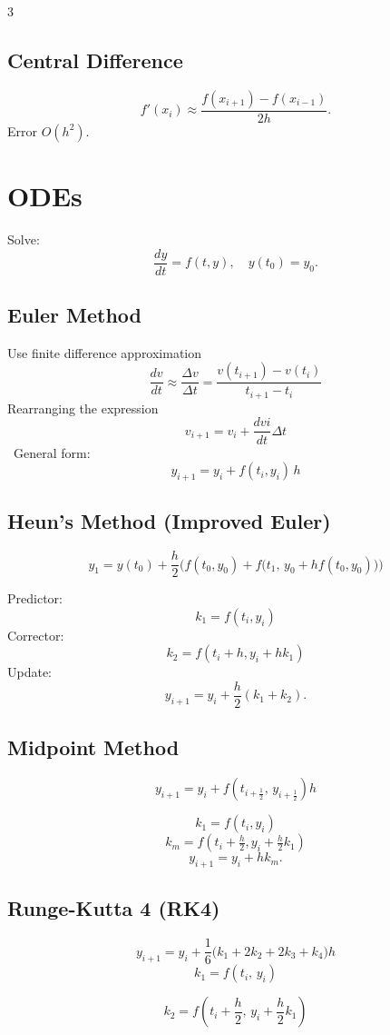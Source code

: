 \documentclass[9pt,a4paper]{article}
\begin{document}
\begin{multicols}{3}
\subsection{Central Difference}
\[
f'(x_i)\approx\frac{f(x_{i+1})-f(x_{i-1})}{2h}.
\]
Error $O(h^2)$.

\section{ODEs}
Solve:
\[
\frac{dy}{dt} = f(t,y),\quad y(t_0)=y_0.
\]

\subsection{Euler Method}
Use finite difference approximation\
\[
\frac{dv}{dt} \approx \frac{\Delta v}{\Delta t}
= \frac{v(t_{i+1}) - v(t_i)}{t_{i+1} - t_i}
\]
Rearranging the expression\
\[
v_{i+1}=v_i + \frac{dvi}{dt}{\Delta t}
\]\
General form:\
\[
y_{i+1} = y_i + f(t_i, y_i)\, h
\]



\subsection{Heun's Method (Improved Euler)}
\[
y_1 = y(t_0) 
    + \frac{h}{2} \Big( 
        f(t_0, y_0) 
        + f\big(t_1,\, y_0 + h f(t_0, y_0)\big)
      \Big)
\]

Predictor:
\[
k_1=f(t_i,y_i)
\]
Corrector:
\[
k_2=f(t_i+h,y_i+h k_1)
\]
Update:
\[
y_{i+1}=y_i+\frac{h}{2}(k_1+k_2).
\]

\subsection{Midpoint Method}
\[
y_{i+1} = y_i + f\!\left(t_{i+\frac{1}{2}},\, y_{i+\frac{1}{2}}\right) h
\]

\[
k_1=f(t_i,y_i)
\]
\[
k_m=f(t_i+\tfrac{h}{2},y_i+\tfrac{h}{2}k_1)
\]
\[
y_{i+1}=y_i+h k_m.
\]

\subsection{Runge-Kutta 4 (RK4)}
\[
y_{i+1}
= y_i
+ \frac{1}{6}\bigl(k_1 + 2k_2 + 2k_3 + k_4\bigr)h
\]
\[
k_1 = f(t_i,\, y_i)
\]

\[
k_2 = f\!\left(t_i + \frac{h}{2},\, y_i + \frac{h}{2}k_1\right)
\]


\end{multicols}
\end{document}

